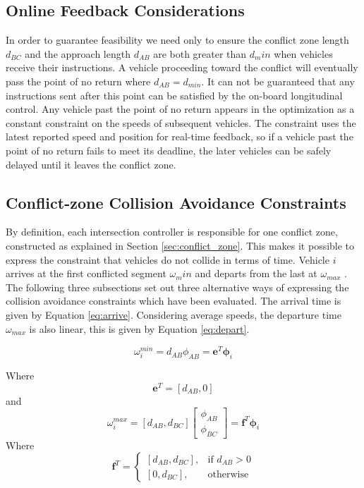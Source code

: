 \subsection{Online Feedback Considerations}
In order to guarantee feasibility we need only to ensure the conflict zone length $d_{BC}$ and the approach length $d_{AB}$ are both greater than $d_min$ when vehicles receive their instructions. A vehicle proceeding toward the conflict will eventually pass the point of no return where $d_{AB} = d_{min}$. It can not be guaranteed that any instructions sent after this point can be satisfied by the on-board longitudinal control. Any vehicle past the point of no return appears in the optimization as a constant constraint on the speeds of subsequent vehicles. The constraint uses the latest reported speed and position for real-time feedback, so if a vehicle past the point of no return fails to meet its deadline, the later vehicles can be safely delayed until it leaves the conflict zone.  

\subsection{Conflict-zone Collision Avoidance Constraints} 
By definition, each intersection controller is responsible for one conflict zone, constructed as explained in Section \ref{sec:conflict_zone}. This makes it
possible to express the constraint that vehicles do not collide
in terms of time. Vehicle $i$ arrives at the first conflicted
segment $\omega_min$ and departs from the last at $\omega_{max}$ . The following three subsections set out three alternative ways
of expressing the collision avoidance constraints which have
been evaluated. The arrival time is given by Equation \ref{eq:arrive}. Considering average speeds, the departure time $\omega_{max}$ is also linear, this is given by Equation \ref{eq:depart}.

\begin{equation}
	\label{eq:arrive}
	\omega_i^{min} = d_{AB} \phi_{AB} = \bm{e}^T \bm{\phi}_i
\end{equation}

Where
\begin{equation}
	\label{eq:e_vec}
	\bm{e}^T = [d_{AB}, 0]
\end{equation}
and 
\begin{equation}
	\label{eq:depart}
	\omega_i^{max} = [d_{AB}, d_{BC}]\left[\begin{array}{c}
		\phi_{AB}\\
		\phi_{BC}
	\end{array}\right] = \bm{f}^T \bm{\phi}_i
\end{equation}
Where
\begin{equation}
	\label{eq:f_vec}
	\bm{f}^T = \begin{cases}
		[d_{AB}, d_{BC}],& \text{if } d_{AB}> 0\\
		[0, d_{BC}],              & \text{otherwise}
	\end{cases}
\end{equation}

